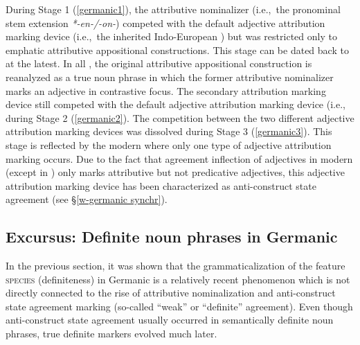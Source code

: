 {During Stage 1 (\ref{germanic1}), the attributive nominalizer (i.e.,~the pronominal stem extension \textit{*-en-/-on-}) competed with the default adjective attribution marking device (i.e.,~the inherited Indo-European ) but was restricted only to emphatic attributive appositional constructions. This stage can be dated back to  at the latest. In all , the original attributive appositional construction is reanalyzed as a true noun phrase in which the former attributive nominalizer marks an adjective in contrastive focus. The secondary attribution marking device still competed with the default adjective attribution marking device (i.e.,~ during Stage 2 (\ref{germanic2}). The competition between the two different adjective attribution marking devices was dissolved during Stage 3 (\ref{germanic3}). This stage is reflected by the modern  where only one type of adjective attribution marking occurs. Due to the fact that agreement inflection of adjectives in modern  (except in ) only marks attributive but not predicative adjectives, this adjective attribution marking device has been characterized as anti\hyp{}construct state agreement (see \S\ref{w-germanic synchr}).

\subsection[Definite noun phrases in Germanic]{Excursus: Definite noun phrases in Germanic}
In the previous section, it was shown that the grammaticalization of the feature \textsc{species} (definiteness) in Germanic is a relatively recent phenomenon which is not directly connected to the rise of attributive nominalization and anti\hyp{}construct state agreement marking (so-called “weak” or “definite” agreement). Even though anti\hyp{}construct state agreement usually occurred in semantically definite noun phrases, true definite markers evolved much later.

}
